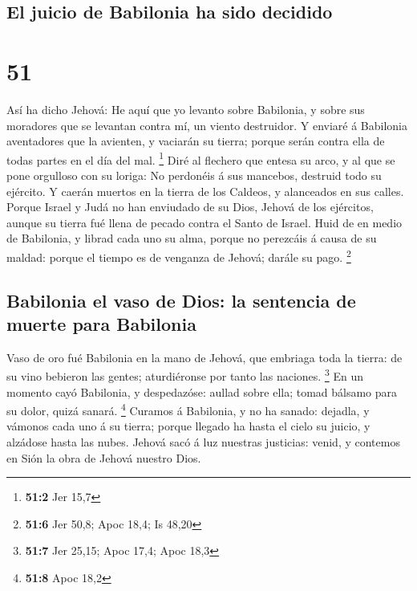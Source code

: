 \hypertarget{el-juicio-de-babilonia-ha-sido-decidido}{%
\subsection{El juicio de Babilonia ha sido
decidido}\label{el-juicio-de-babilonia-ha-sido-decidido}}

\hypertarget{section-50}{%
\section{51}\label{section-50}}

 Así ha dicho Jehová: He aquí que yo levanto sobre
Babilonia, y sobre sus moradores que se levantan contra mí, un viento
destruidor.  Y enviaré á Babilonia aventadores que la
avienten, y vaciarán su tierra; porque serán contra ella de todas partes
en el día del mal. \footnote{\textbf{51:2} Jer 15,7}  Diré
al flechero que entesa su arco, y al que se pone orgulloso con su
loriga: No perdonéis á sus mancebos, destruid todo su ejército.
 Y caerán muertos en la tierra de los Caldeos, y alanceados
en sus calles.  Porque Israel y Judá no han enviudado de su
Dios, Jehová de los ejércitos, aunque su tierra fué llena de pecado
contra el Santo de Israel.  Huid de en medio de Babilonia, y
librad cada uno su alma, porque no perezcáis á causa de su maldad:
porque el tiempo es de venganza de Jehová; darále su pago. \footnote{\textbf{51:6}
  Jer 50,8; Apoc 18,4; Is 48,20}

\hypertarget{babilonia-el-vaso-de-dios-la-sentencia-de-muerte-para-babilonia}{%
\subsection{Babilonia el vaso de Dios: la sentencia de muerte para
Babilonia}\label{babilonia-el-vaso-de-dios-la-sentencia-de-muerte-para-babilonia}}

 Vaso de oro fué Babilonia en la mano de Jehová, que
embriaga toda la tierra: de su vino bebieron las gentes; aturdiéronse
por tanto las naciones. \footnote{\textbf{51:7} Jer 25,15; Apoc 17,4;
  Apoc 18,3}  En un momento cayó Babilonia, y despedazóse:
aullad sobre ella; tomad bálsamo para su dolor, quizá sanará.
\footnote{\textbf{51:8} Apoc 18,2}  Curamos á Babilonia, y
no ha sanado: dejadla, y vámonos cada uno á su tierra; porque llegado ha
hasta el cielo su juicio, y alzádose hasta las nubes. 
Jehová sacó á luz nuestras justicias: venid, y contemos en Sión la obra
de Jehová nuestro Dios.

